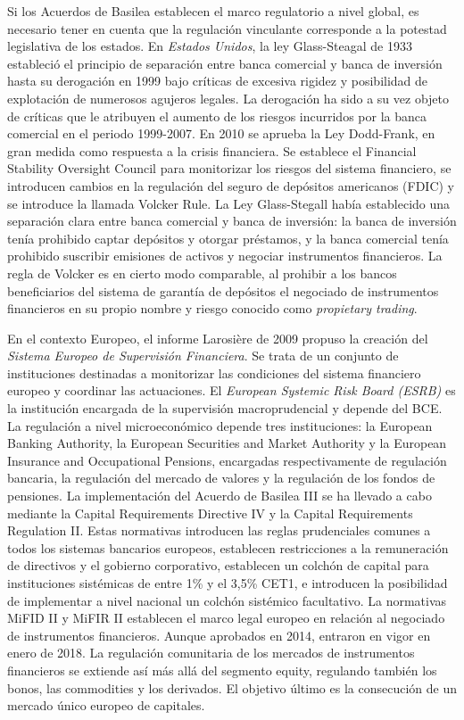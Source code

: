 \documentclass{nuevotema}
\begin{document}
Si los Acuerdos de Basilea establecen el marco regulatorio a nivel global, es necesario tener en cuenta que la regulación vinculante corresponde a la potestad legislativa de los estados. En \textit{Estados Unidos}, la ley Glass-Steagal de 1933 estableció el principio de separación entre banca comercial y banca de inversión hasta su derogación en 1999 bajo críticas de excesiva rigidez y posibilidad de explotación de numerosos agujeros legales. La derogación ha sido a su vez objeto de críticas que le atribuyen el aumento de los riesgos incurridos por la banca comercial en el periodo 1999-2007. En 2010 se aprueba la Ley Dodd-Frank, en gran medida como respuesta a la crisis financiera. Se establece el Financial Stability Oversight Council para monitorizar los riesgos del sistema financiero, se introducen cambios en la regulación del seguro de depósitos americanos (FDIC) y se introduce la llamada Volcker Rule. La Ley Glass-Stegall había establecido una separación clara entre banca comercial y banca de inversión: la banca de inversión tenía prohibido captar depósitos y otorgar préstamos, y la banca comercial tenía prohibido suscribir emisiones de activos y negociar instrumentos financieros. La regla de Volcker es en cierto modo comparable, al prohibir a los bancos beneficiarios del sistema de garantía de depósitos el negociado de instrumentos financieros en su propio nombre y riesgo conocido como \textit{propietary trading}.

En el contexto Europeo, el informe Larosière de 2009 propuso la creación del \textit{Sistema Europeo de Supervisión Financiera}. Se trata de un conjunto de instituciones destinadas a monitorizar las condiciones del sistema financiero europeo y coordinar las actuaciones. El \textit{European Systemic Risk Board (ESRB)} es la institución encargada de la supervisión macroprudencial y depende del BCE. La regulación a nivel microeconómico depende tres instituciones: la European Banking Authority, la European Securities and Market Authority y la European Insurance and Occupational Pensions, encargadas respectivamente de regulación bancaria, la regulación del mercado de valores y la regulación de los fondos de pensiones. La implementación del Acuerdo de Basilea III se ha llevado a cabo mediante la Capital Requirements Directive IV y la Capital Requirements Regulation II. Estas normativas introducen las reglas prudenciales comunes a todos los sistemas bancarios europeos, establecen restricciones a la remuneración de directivos y el gobierno corporativo, establecen un colchón de capital para instituciones sistémicas de entre 1\% y el 3,5\% CET1, e introducen la posibilidad de implementar a nivel nacional un colchón sistémico facultativo. La normativas MiFID II y MiFIR II establecen el marco legal europeo en relación al negociado de instrumentos financieros. Aunque aprobados en 2014, entraron en vigor en enero de 2018. La regulación comunitaria de los mercados de instrumentos financieros se extiende así más allá del segmento equity, regulando también los bonos, las commodities y los derivados. El objetivo último es la consecución de un mercado único europeo de capitales.
\end{document}
